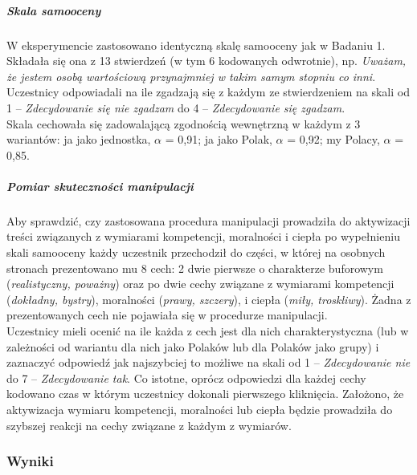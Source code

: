 \documentclass[man]{apa6}
\begin{document}
\subparagraph{Skala samooceny}
W eksperymencie zastosowano identyczną skalę samooceny jak w Badaniu 1. Składała się ona z 13 stwierdzeń (w tym 6 kodowanych odwrotnie), np. \emph{Uważam, że jestem osobą wartościową przynajmniej w takim samym stopniu co inni}. Uczestnicy odpowiadali na ile zgadzają się z każdym ze stwierdzeniem na skali od 1 -- \emph{Zdecydowanie się nie zgadzam} do 4 -- \emph{Zdecydowanie się zgadzam}. \\
Skala cechowała się zadowalającą zgodnością wewnętrzną w każdym z 3 wariantów: ja jako jednostka, $\alpha$ = 0,91; ja jako Polak, $\alpha$ = 0,92; my Polacy, $\alpha$ = 0,85.
\subparagraph{Pomiar skuteczności manipulacji}
Aby sprawdzić, czy zastosowana procedura manipulacji prowadziła do aktywizacji treści związanych z wymiarami kompetencji, moralności i ciepła po wypełnieniu skali samooceny każdy uczestnik przechodził do części, w której na osobnych stronach prezentowano mu 8 cech: 2 dwie pierwsze o charakterze buforowym (\emph{realistyczny, poważny}) oraz po dwie cechy związane z wymiarami kompetencji (\emph{dokładny, bystry}), moralności (\emph{prawy, szczery}), i ciepła (\emph{miły, troskliwy}). Żadna z prezentowanych cech nie pojawiała się w procedurze manipulacji. \\
Uczestnicy mieli ocenić na ile każda z cech jest dla nich charakterystyczna (lub w zależności od wariantu dla nich jako Polaków lub dla Polaków jako grupy) i zaznaczyć odpowiedź jak najszybciej to możliwe na skali od 1 -- \emph{Zdecydowanie nie} do 7 -- \emph{Zdecydowanie tak}. Co istotne, oprócz odpowiedzi dla każdej cechy kodowano czas w którym uczestnicy dokonali pierwszego kliknięcia. Założono, że aktywizacja wymiaru kompetencji, moralności lub ciepła będzie prowadziła do szybszej reakcji na cechy związane z każdym z wymiarów.

\subsubsection{Wyniki}
\end{document}
